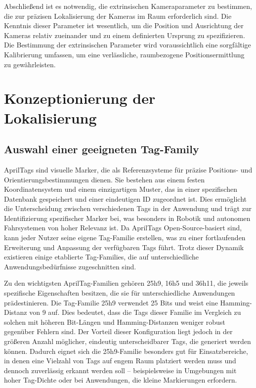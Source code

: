 \documentclass[ngerman]{article}    %
\theoremstyle{definition}
\begin{document}
Abschließend ist es notwendig, die extrinsischen Kameraparameter zu bestimmen, die zur präzisen Lokalisierung der Kameras im Raum erforderlich sind. Die Kenntnis dieser Parameter ist wesentlich, um die Position und Ausrichtung der Kameras relativ zueinander und zu einem definierten Ursprung zu spezifizieren. Die Bestimmung der extrinsischen Parameter wird voraussichtlich eine sorgfältige Kalibrierung umfassen, um eine verlässliche, raumbezogene Positionsermittlung zu gewährleisten.

\newpage
\section{Konzeptionierung der Lokalisierung}


\subsection{Auswahl einer geeigneten Tag-Family}

AprilTags sind visuelle Marker, die als Referenzsysteme für präzise Positions- und Orientierungsbestimmungen dienen. Sie bestehen aus einem festen Koordinatensystem und einem einzigartigen Muster, das in einer spezifischen Datenbank gespeichert und einer eindeutigen ID zugeordnet ist. Dies ermöglicht die Unterscheidung zwischen verschiedenen Tags in der Anwendung und trägt zur Identifizierung spezifischer Marker bei, was besonders in Robotik und autonomen Fahrsystemen von hoher Relevanz ist. Da AprilTags Open-Source-basiert sind, kann jeder Nutzer seine eigene Tag-Familie erstellen, was zu einer fortlaufenden Erweiterung und Anpassung der verfügbaren Tags führt. Trotz dieser Dynamik existieren einige etablierte Tag-Families, die auf unterschiedliche Anwendungsbedürfnisse zugeschnitten sind. 

Zu den wichtigsten AprilTag-Familien gehören 25h9, 16h5 und 36h11, die jeweils spezifische Eigenschaften besitzen, die sie für unterschiedliche Anwendungen prädestinieren. Die Tag-Familie 25h9 verwendet 25 Bits und weist eine Hamming-Distanz von 9 auf. Dies bedeutet, dass die Tags dieser Familie im Vergleich zu solchen mit höheren Bit-Längen und Hamming-Distanzen weniger robust gegenüber Fehlern sind. Der Vorteil dieser Konfiguration liegt jedoch in der größeren Anzahl möglicher, eindeutig unterscheidbarer Tags, die generiert werden können. Dadurch eignet sich die 25h9-Familie besonders gut für Einsatzbereiche, in denen eine Vielzahl von Tags auf engem Raum platziert werden muss und dennoch zuverlässig erkannt werden soll – beispielsweise in Umgebungen mit hoher Tag-Dichte oder bei Anwendungen, die kleine Markierungen erfordern.
\end{document}
